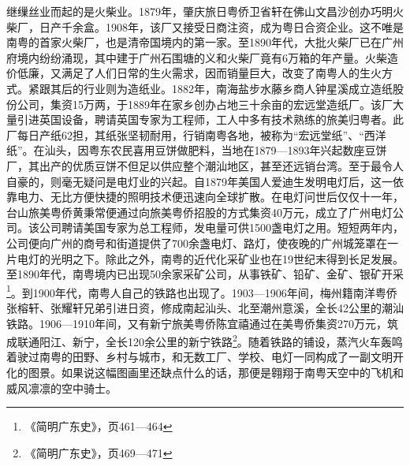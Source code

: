 继缫丝业而起的是火柴业。1879年，肇庆旅日粤侨卫省轩在佛山文昌沙创办巧明火柴厂，日产千余盒。1908年，该厂又接受日商注资，成为粤日合资企业。这不唯是南粤的首家火柴厂，也是清帝国境内的第一家。至1890年代，大批火柴厂已在广州府境内纷纷涌现，其中建于广州石围塘的义和火柴厂竟有6万箱的年产量。火柴造价低廉，又满足了人们日常的生火需求，因而销量巨大，改变了南粤人的生火方式。紧跟其后的行业则为造纸业。1882年，南海盐步水藤乡商人钟星溪成立造纸股份公司，集资15万两，于1889年在家乡创办占地三十余亩的宏远堂造纸厂。该厂大量引进英国设备，聘请英国专家为工程师，工人中多有技术熟练的旅美归粤者。此厂每日产纸62担，其纸张坚韧耐用，行销南粤各地，被称为“宏远堂纸”、“西洋纸”。在汕头，因粤东农民喜用豆饼做肥料，当地在1879—1893年兴起数座豆饼厂，其出产的优质豆饼不但足以供应整个潮汕地区，甚至还远销台湾。至于最令人自豪的，则毫无疑问是电灯业的兴起。自1879年美国人爱迪生发明电灯后，这一依靠电力、无比方便快捷的照明技术便迅速向全球扩散。在电灯问世后仅仅十一年，台山旅美粤侨黄秉常便通过向旅美粤侨招股的方式集资40万元，成立了广州电灯公司。该公司聘请美国专家为总工程师，发电量可供1500盏电灯之用。短短两年内，公司便向广州的商号和街道提供了700余盏电灯、路灯，使夜晚的广州城笼罩在一片电灯的光明之下。除此之外，南粤的近代化采矿业也在19世纪末得到长足发展。至1890年代，南粤境内已出现50余家采矿公司，从事铁矿、铅矿、金矿、银矿开采\footnote{《简明广东史》，页461—464}。到1900年代，南粤人自己的铁路也出现了。1903—1906年间，梅州籍南洋粤侨张榕轩、张耀轩兄弟引进日资，修成南起汕头、北至潮州意溪，全长42公里的潮汕铁路。1906—1910年间，又有新宁旅美粤侨陈宜禧通过在美粤侨集资270万元，筑成联通阳江、新宁，全长120余公里的新宁铁路\footnote{《简明广东史》，页469—471}。随着铁路的铺设，蒸汽火车轰鸣着驶过南粤的田野、乡村与城市，和无数工厂、学校、电灯一同构成了一副文明开化的图景。如果说这幅图画里还缺点什么的话，那便是翱翔于南粤天空中的飞机和威风凛凛的空中骑士。

